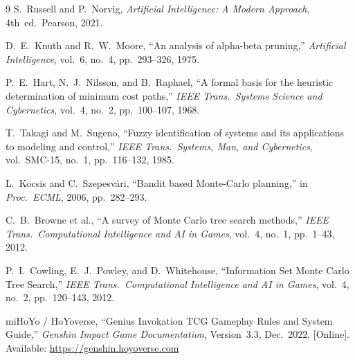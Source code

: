 \documentclass[11pt,a4paper]{article}
\begin{document}
\begin{thebibliography}{9}
\footnotesize
\setlength{\itemsep}{0pt}
\setlength{\parskip}{0pt}
S.~Russell and P.~Norvig, \emph{Artificial Intelligence: A Modern Approach}, 4th~ed.\ Pearson, 2021.

D.~E.~Knuth and R.~W.~Moore, ``An analysis of alpha-beta pruning,'' \emph{Artificial Intelligence}, vol.~6, no.~4, pp.~293--326, 1975.

P.~E.~Hart, N.~J.~Nilsson, and B.~Raphael, ``A formal basis for the heuristic determination of minimum cost paths,'' \emph{IEEE Trans.\ Systems Science and Cybernetics}, vol.~4, no.~2, pp.~100--107, 1968.

T.~Takagi and M.~Sugeno, ``Fuzzy identification of systems and its applications to modeling and control,'' \emph{IEEE Trans.\ Systems, Man, and Cybernetics}, vol.~SMC-15, no.~1, pp.~116--132, 1985.

L.~Kocsis and C.~Szepesv\'{a}ri, ``Bandit based Monte-Carlo planning,'' in \emph{Proc.\ ECML}, 2006, pp.~282--293.

C.~B.~Browne et al., ``A survey of Monte Carlo tree search methods,'' \emph{IEEE Trans.\ Computational Intelligence and AI in Games}, vol.~4, no.~1, pp.~1--43, 2012.

P.~I.~Cowling, E.~J.~Powley, and D.~Whitehouse, ``Information Set Monte Carlo Tree Search,'' \emph{IEEE Trans.\ Computational Intelligence and AI in Games}, vol.~4, no.~2, pp.~120--143, 2012.

miHoYo / HoYoverse, ``Genius Invokation TCG Gameplay Rules and System Guide,'' \emph{Genshin Impact Game Documentation}, Version~3.3, Dec.~2022. [Online]. Available: \url{https://genshin.hoyoverse.com}
\end{thebibliography}
\end{document}
